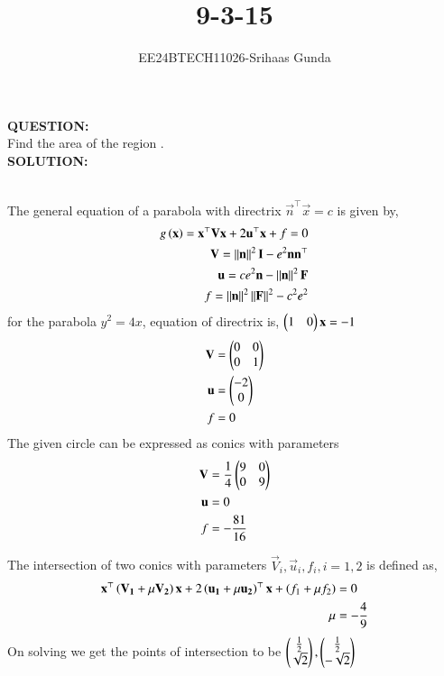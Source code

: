 \documentclass[journal]{IEEEtran}
\numberwithin{equation}{enumi}
\numberwithin{figure}{enumi}
\begin{document}


\title{9-3-15}
\author{EE24BTECH11026-Srihaas Gunda}

{\let\newpage\relax\maketitle}

\textbf{QUESTION:} \\
	Find the area of the region .\\
\textbf{SOLUTION:} \\
	\begin{table}[h!]    
		\centering
		
	\end{table}\\

	The general equation of a parabola with directrix $\vec{n}^{\top}\vec{x}=c$ is given by,
	\begin{align*}
		g\left(\mathbf{x}\right)=\mathbf{x}^{\top}\mathbf{V}\mathbf{x}+2\mathbf{u}^{\top}\mathbf{x}+f=0\\
		\mathbf{V}=\left\lVert\mathbf{n}\right\rVert^2\mathbf{I}-e^2\mathbf{n}\mathbf{n}^{\top}\\
		\mathbf{u}=ce^2\mathbf{n}-\left\lVert\mathbf{n}\right\rVert^2\mathbf{F}\\
		f=\left\lVert\mathbf{n}\right\rVert^2\left\lVert\mathbf{F}\right\rVert^2-c^2e^2
	\end{align*}
	for the parabola $y^2=4x$, equation of directrix is, $\begin{pmatrix}1&0\end{pmatrix}\mathbf{x}=-1$
	\begin{align*}
		\mathbf{V}&=\begin{pmatrix}0&0\\0&1\end{pmatrix}\\
		\mathbf{u}&=\begin{pmatrix}-2\\0\end{pmatrix}\\
		f&=0
	\end{align*}
	The given circle can be expressed as conics with parameters
	\begin{align*}
		\mathbf{V}&=\frac{1}{4}\begin{pmatrix}9 & 0\\0 & 9\end{pmatrix}\\
		\mathbf{u}&=0\\
		f&=-\frac{81}{16}
	\end{align*}

	The intersection of two conics with parameters $\vec{V}_i,\vec{u}_i,f_i, i=1,2$ is defined as,
	\begin{align*}
		\mathbf{x}^{\top}\left(\mathbf{V_1}+\mu\mathbf{V_2}\right)\mathbf{x}+2\left(\mathbf{u_1}+\mu\mathbf{u_2}\right)^{\top}\mathbf{x}+\left(f_1+\mu f_2\right)&=0\\
		\mu&=-\frac{4}{9}\\
	\end{align*} 
	On solving we get the points of intersection to be $\begin{pmatrix}\frac{1}{2}\\\sqrt{2}\end{pmatrix}, \begin{pmatrix}\frac{1}{2}\\-\sqrt{2}\end{pmatrix}$\\
	
\end{document}

